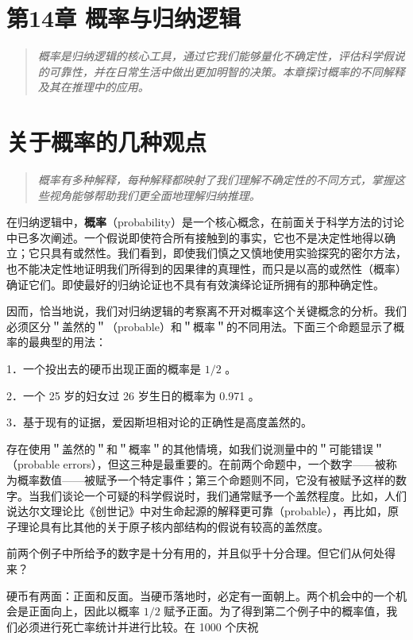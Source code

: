 \section{第14章 概率与归纳逻辑}

\begin{quotation}
\textit{概率是归纳逻辑的核心工具，通过它我们能够量化不确定性，评估科学假说的可靠性，并在日常生活中做出更加明智的决策。本章探讨概率的不同解释及其在推理中的应用。}
\end{quotation}

\section{关于概率的几种观点}

\begin{quotation}
\textit{概率有多种解释，每种解释都映射了我们理解不确定性的不同方式，掌握这些视角能够帮助我们更全面地理解归纳推理。}
\end{quotation}

在归纳逻辑中，\textbf{概率}（probability）是一个核心概念，在前面关于科学方法的讨论中已多次阐述。一个假说即使符合所有接触到的事实，它也不是决定性地得以确立；它只具有或然性。我们看到，即使我们慎之又慎地使用实验探究的密尔方法，也不能决定性地证明我们所得到的因果律的真理性，而只是以高的或然性（概率）确证它们。即使最好的归纳论证也不具有有效演绎论证所拥有的那种确定性。

因而，恰当地说，我们对归纳逻辑的考察离不开对概率这个关键概念的分析。我们必须区分＂盖然的＂（probable）和＂概率＂的不同用法。下面三个命题显示了概率的最典型的用法：

1．一个投出去的硬币出现正面的概率是 $1 / 2$ 。

2．一个 25 岁的妇女过 26 岁生日的概率为 0.971 。

3．基于现有的证据，爱因斯坦相对论的正确性是高度盖然的。

存在使用＂盖然的＂和＂概率＂的其他情境，如我们说测量中的＂可能错误＂（probable errors），但这三种是最重要的。在前两个命题中，一个数字——被称为概率数值——被赋予一个特定事件；第三个命题则不同，它没有被赋予这样的数字。当我们谈论一个可疑的科学假说时，我们通常赋予一个盖然程度。比如，人们说达尔文理论比《创世记》中对生命起源的解释更可靠（probable），再比如，原子理论具有比其他的关于原子核内部结构的假说有较高的盖然度。

前两个例子中所给予的数字是十分有用的，并且似乎十分合理。但它们从何处得来？

硬币有两面：正面和反面。当硬币落地时，必定有一面朝上。两个机会中的一个机会是正面向上，因此以概率 $1 / 2$ 赋予正面。为了得到第二个例子中的概率值，我们必须进行死亡率统计并进行比较。在 1000 个庆祝


